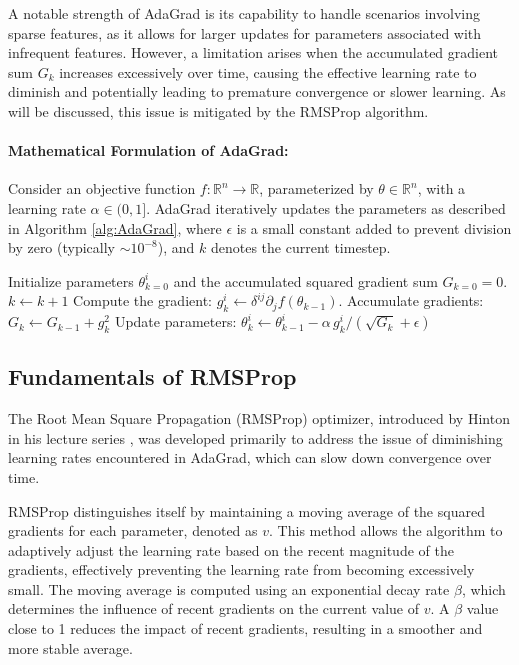 \documentclass{article} %
\begin{document}
A notable strength of AdaGrad is its capability to handle scenarios involving sparse features, as it allows for larger updates for parameters associated with infrequent features. However, a limitation arises when the accumulated gradient sum \( G_k \) increases excessively over time, causing the effective learning rate to diminish and potentially leading to premature convergence or slower learning. As will be discussed, this issue is mitigated by the RMSProp algorithm.

\paragraph{Mathematical Formulation of AdaGrad:} Consider an objective function \( f: \mathbb{R}^n\to \mathbb{R} \), parameterized by \( \theta \in \mathbb{R}^n \), with a learning rate \( \alpha\in(0,1] \). AdaGrad iteratively updates the parameters as described in Algorithm \ref{alg:AdaGrad}, where \( \epsilon \) is a small constant added to prevent division by zero (typically \( \sim 10^{-8} \)), and \( k \) denotes the current timestep.

\begin{algorithm}
\caption{AdaGrad Optimization Algorithm}
\label{alg:AdaGrad}
\begin{algorithmic}[1] 
    \State Initialize parameters $\theta^i_{k=0}$ and the accumulated squared gradient sum $G_{k=0} = 0$.
        \State $k \leftarrow k + 1$
        \State Compute the gradient: $g^i_{k} \leftarrow \delta^{ij} \partial_j f(\theta_{k-1})$.
        \State Accumulate gradients: $G_{k} \leftarrow G_{k-1} + g^2_k$
        \State Update parameters: $\theta^i_{k} \leftarrow \theta^i_{k-1} - \alpha\, g^i_{k}/(\sqrt{G_{k}} + \epsilon)$
    \EndWhile
\end{algorithmic}
\end{algorithm}

\subsection{Fundamentals of RMSProp}

The Root Mean Square Propagation (RMSProp) optimizer, introduced by Hinton in his lecture series \cite{hinton_lecture6}, was developed primarily to address the issue of diminishing learning rates encountered in AdaGrad, which can slow down convergence over time.

RMSProp distinguishes itself by maintaining a moving average of the squared gradients for each parameter, denoted as \( v \). This method allows the algorithm to adaptively adjust the learning rate based on the recent magnitude of the gradients, effectively preventing the learning rate from becoming excessively small. The moving average is computed using an exponential decay rate \( \beta \), which determines the influence of recent gradients on the current value of \( v \). A \(\beta\) value close to 1 reduces the impact of recent gradients, resulting in a smoother and more stable average.
\end{document}
